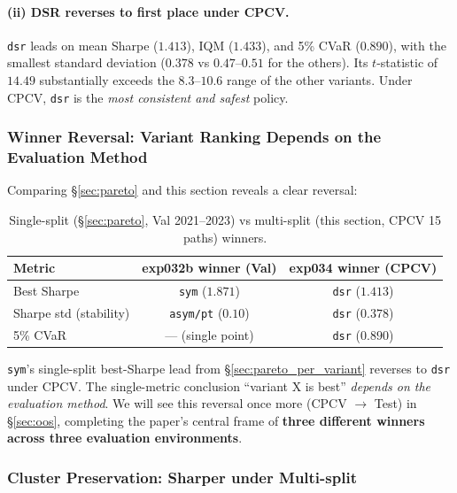 \documentclass[11pt, a4paper]{article}
\begin{document}
\paragraph{(ii) DSR reverses to first place under CPCV.}
\texttt{dsr} leads on mean Sharpe ($1.413$), IQM ($1.433$), and 5\% CVaR
($0.890$), with the smallest standard deviation ($0.378$ vs $0.47$--$0.51$
for the others). Its $t$-statistic of $14.49$ substantially exceeds the
$8.3$--$10.6$ range of the other variants. Under CPCV, \texttt{dsr} is the
\emph{most consistent and safest} policy.

\subsubsection{Winner Reversal: Variant Ranking Depends on the Evaluation Method}
\label{sec:cpcv_reversal}

Comparing \S\ref{sec:pareto} and this section reveals a clear reversal:

\begin{table}[!htbp]
\centering
\caption{Single-split (\S\ref{sec:pareto}, Val 2021--2023) vs multi-split
(this section, CPCV 15 paths) winners.}
\begin{tabular}{lcc}
\toprule
Metric & exp032b winner (Val) & exp034 winner (CPCV) \\
\midrule
Best Sharpe & \texttt{sym} ($1.871$) & \texttt{dsr} ($1.413$) \\
Sharpe std (stability) & \texttt{asym/pt} ($0.10$) & \texttt{dsr} ($0.378$) \\
5\% CVaR & --- (single point) & \texttt{dsr} ($0.890$) \\
\bottomrule
\end{tabular}
\label{tab:cpcv_reversal}
\end{table}

\texttt{sym}'s single-split best-Sharpe lead from
\S\ref{sec:pareto_per_variant} reverses to \texttt{dsr} under CPCV. The
single-metric conclusion ``variant X is best'' \emph{depends on the
evaluation method}. We will see this reversal once more (CPCV $\to$ Test) in
\S\ref{sec:oos}, completing the paper's central frame of \textbf{three
different winners across three evaluation environments}.

\subsubsection{Cluster Preservation: Sharper under Multi-split}
\label{sec:cpcv_cluster}
\end{document}
